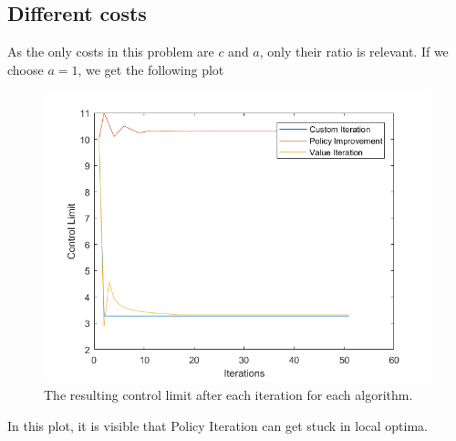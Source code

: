 \subsection{Different costs}
As the only costs in this problem are $c$ and $a$, only their ratio is relevant.
If we choose $a=1$, we get the following plot
\begin{figure}[H]
\centering
\includegraphics[width=\textwidth]{Plots/CL Weibull2-2 Discount-1 Start-1 a-1.png}
\caption{The resulting control limit after each iteration for each algorithm.}
\end{figure}
In this plot, it is visible that Policy Iteration can get stuck in local optima.
